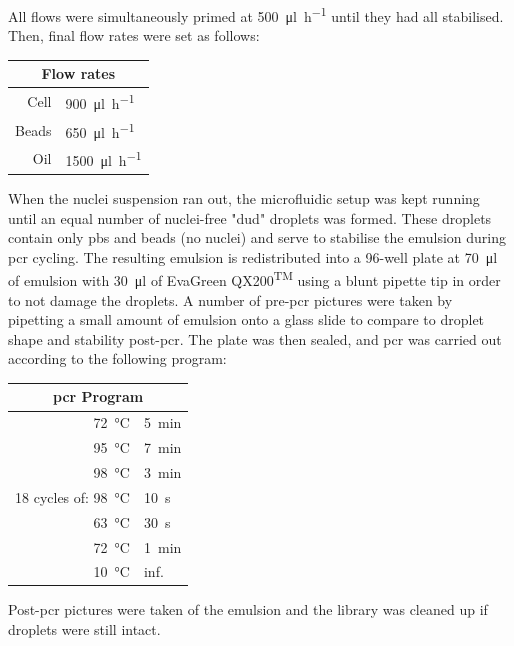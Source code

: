 \begin{appendix}
\begin{multicols}{2}
All flows were simultaneously primed at \SI{500}{\ul\per\hour} until they had all stabilised. Then, final flow rates were set as follows:\pms

\begin{center}
\begin{tabular}{r|l}
	\multicolumn{2}{c}{Flow rates} \\
	\hline
	Cell & \SI{900}{\ul\per\hour} \\
	Beads & \SI{650}{\ul\per\hour} \\
	Oil & \SI{1500}{\ul\per\hour} \\
\end{tabular}
\end{center}
\medskip

When the nuclei suspension ran out, the microfluidic setup was kept running until an equal number of nuclei-free "dud" droplets was formed. These droplets contain only \acrshort{pbs} and beads (no nuclei) and serve to stabilise the emulsion during \acrshort{pcr} cycling. The resulting emulsion is redistributed into a 96-well plate at \SI{70}{\ul} of emulsion with \SI{30}{\ul} of EvaGreen QX200\textsuperscript{TM} using a blunt pipette tip in order to not damage the droplets. A number of pre-\acrshort{pcr} pictures were taken by pipetting a small amount of emulsion onto a glass slide to compare to droplet shape and stability post-\acrshort{pcr}. The plate was then sealed, and \acrshort{pcr} was carried out according to the following program:\pms

\begin{center}
\begin{tabular}{r|l}
	\multicolumn{2}{c}{\acrshort{pcr} Program} \\
	\hline
	\SI{72}{\celsius} & \SI{5}{\minute} \\
	\SI{95}{\celsius} & \SI{7}{\minute} \\
	\SI{98}{\celsius} & \SI{3}{\minute} \\
	\hline
	18 cycles of: \SI{98}{\celsius} & \SI{10}{\second} \\
	\SI{63}{\celsius} & \SI{30}{\second} \\
	\SI{72}{\celsius} & \SI{1}{\minute} \\
	\hline
	\SI{10}{\celsius} & inf. \\
\end{tabular}
\end{center}
\medskip

Post-\acrshort{pcr} pictures were taken of the emulsion and the library was cleaned up if droplets were still intact.\pms


\end{multicols}
\end{appendix}
